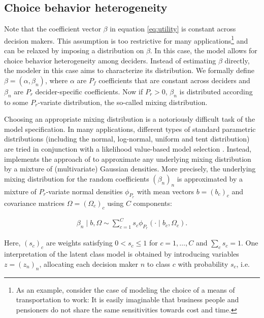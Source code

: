 \documentclass[article]{jss}
\begin{document}
\subsection{Choice behavior heterogeneity} \label{subsec:heterogeneity}

Note that the coefficient vector $\beta$ in equation \eqref{eq:utility} is constant across decision makers. This assumption is too restrictive for many applications\footnote{As an example, consider the case of modeling the choice of a means of transportation to work: It is easily imaginable that business people and pensioners do not share the same sensitivities towards cost and time.} and can be relaxed by imposing a distribution on $\beta$. In this case, the model allows for choice behavior heterogeneity among deciders. Instead of estimating $\beta$ directly, the modeler in this case aims to characterize its distribution. We formally define $\beta = (\alpha, \beta_n)$, where $\alpha$ are $P_f$ coefficients that are constant across deciders and $\beta_n$ are $P_r$ decider-specific coefficients. Now if $P_r>0$, $\beta_n$ is distributed according to some $P_r$-variate distribution, the so-called mixing distribution.

Choosing an appropriate mixing distribution is a notoriously difficult task of the model specification. In many applications, different types of standard parametric distributions (including the normal, log-normal, uniform and tent distribution) are tried in conjunction with a likelihood value-based model selection \citep{Train:2009}. Instead,  implements the approach of \cite{Oelschlaeger:2020} to approximate any underlying mixing distribution by a mixture of (multivariate) Gaussian densities. More precisely, the underlying mixing distribution for the random coefficients $(\beta_n)_{n}$ is approximated by a mixture of $P_r$-variate normal densities $\phi_{P_r}$ with mean vectors $b=(b_c)_{c}$ and covariance matrices $\Omega=(\Omega_c)_{c}$ using $C$ components:

\begin{align*}
\beta_n\mid b,\Omega \sim \sum_{c=1}^{C} s_c \phi_{P_r} (\cdot \mid b_c,\Omega_c).
\end{align*}

Here, $(s_c)_{c}$ are weights satisfying $0 < s_c\leq 1$ for $c=1,\dots,C$ and $\sum_c s_c=1$. One interpretation of the latent class model is obtained by introducing variables $z=(z_n)_n$, allocating each decision maker $n$ to class $c$ with probability $s_c$, i.e.
\end{document}
